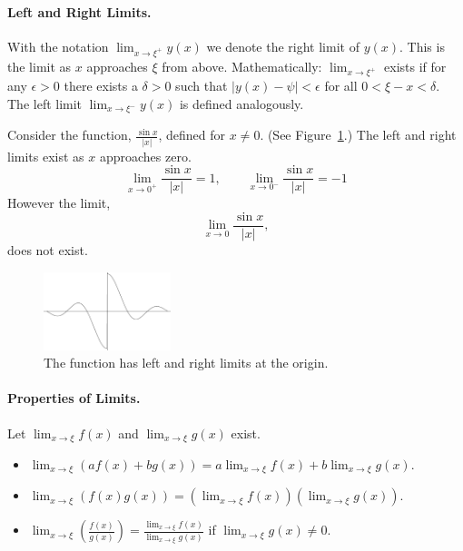 \paragraph{Left and Right Limits.}
With the notation $\lim_{x \to \xi^+} y(x)$ we denote the right limit of 
$y(x)$.  This is the limit as $x$ approaches $\xi$ from above.  
Mathematically: $\lim_{x \to \xi^+}$ exists if for any $\epsilon > 0$ 
there exists a $\delta > 0$ such that $|y(x) - \psi| < \epsilon$ for all 
$0 < \xi - x < \delta$.  The left limit $\lim_{x \to \xi^-} y(x)$ is 
defined analogously.



\begin{Example}
  Consider the function, $\frac{\sin x}{|x|}$, defined for $x \neq 0$.  
  (See Figure~\ref{sinxabsx}.)
  The left and right limits exist as $x$ approaches zero.
  \[
  \lim_{x \to 0^+} \frac{\sin x}{|x|} = 1, \qquad
  \lim_{x \to 0^-} \frac{\sin x}{|x|} = -1 
  \]
  However the limit, 
  \[
  \lim_{x \to 0} \frac{\sin x}{|x|},
  \]
  does not exist.
  \begin{figure}[h!]
    \begin{center}
      \includegraphics[width=0.33\textwidth]{calculus/differential/sinxabsx}
    \end{center}
    \caption{The function has left and right limits at the origin.}
    \label{sinxabsx}
  \end{figure}
\end{Example}







\paragraph{Properties of Limits.}
Let $\displaystyle \lim_{x \to \xi} f(x)$ and $\displaystyle \lim_{x \to \xi} g(x)$ 
exist.
\begin{itemize}
\item
  $\displaystyle 
  \lim_{x \to \xi} \left( a f(x) + b g(x) \right)
  = a \lim_{x \to \xi} f(x) + b \lim_{x \to \xi} g(x)
  $.
\item
  $\displaystyle 
  \lim_{x \to \xi} \left( f(x) g(x) \right)
  = \left(\lim_{x \to \xi} f(x) \right) \left( \lim_{x \to \xi} g(x) \right)
  $.
\item
  $\displaystyle 
  \lim_{x \to \xi} \left( \frac{f(x)}{g(x)} \right)
  = \frac{\lim_{x \to \xi} f(x)}{\lim_{x \to \xi} g(x)}
  $ 
  if 
  $\displaystyle 
  \lim_{x \to \xi} g(x) \neq 0
  $.
\end{itemize}





